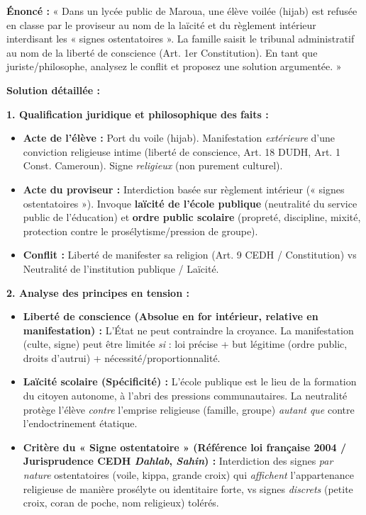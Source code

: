 \documentclass[11pt]{article}
\newcommand{\cle}[1]{{\popxbold\color{popdark}#1}}
\begin{document}
\begin{exoresolu}
\textbf{Énoncé :} « Dans un lycée public de Maroua, une élève voilée (hijab) est refusée en classe par le proviseur au nom de la laïcité et du règlement intérieur interdisant les « signes ostentatoires ». La famille saisit le tribunal administratif au nom de la liberté de conscience (Art. 1er Constitution). En tant que juriste/philosophe, analysez le conflit et proposez une solution argumentée. »

\tcblower
\textbf{Solution détaillée :}

\textbf{1. Qualification juridique et philosophique des faits :}
\begin{itemize}
    \item \textbf{Acte de l'élève :} Port du voile (hijab). Manifestation \emph{extérieure} d'une conviction religieuse intime (liberté de conscience, Art. 18 DUDH, Art. 1 Const. Cameroun). Signe \emph{religieux} (non purement culturel).
    \item \textbf{Acte du proviseur :} Interdiction basée sur règlement intérieur (« signes ostentatoires »). Invoque \textbf{laïcité de l'école publique} (neutralité du service public de l'éducation) et \textbf{ordre public scolaire} (propreté, discipline, mixité, protection contre le prosélytisme/pression de groupe).
    \item \textbf{Conflit :} \cle{Liberté de manifester sa religion} (Art. 9 CEDH / Constitution) vs \cle{Neutralité de l'institution publique / Laïcité}.
\end{itemize}

\textbf{2. Analyse des principes en tension :}
\begin{itemize}
    \item \textbf{Liberté de conscience (Absolue en for intérieur, relative en manifestation) :} L'État ne peut contraindre la croyance. La manifestation (culte, signe) peut être limitée \emph{si} : loi précise + but légitime (ordre public, droits d'autrui) + nécessité/proportionnalité.
    \item \textbf{Laïcité scolaire (Spécificité) :} L'école publique est le lieu de la \cle{formation du citoyen autonome}, à l'abri des pressions communautaires. La neutralité protège l'élève \emph{contre} l'emprise religieuse (famille, groupe) \emph{autant que} contre l'endoctrinement étatique.
    \item \textbf{Critère du « Signe ostentatoire » (Référence loi française 2004 / Jurisprudence CEDH \emph{Dahlab}, \emph{Sahin}) :} Interdiction des signes \emph{par nature} ostentatoires (voile, kippa, grande croix) qui \emph{affichent} l'appartenance religieuse de manière prosélyte ou identitaire forte, vs signes \emph{discrets} (petite croix, coran de poche, nom religieux) tolérés.
\end{itemize}


\end{exoresolu}
\end{document}
